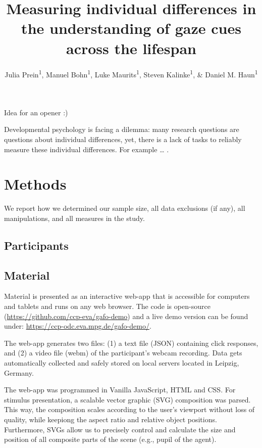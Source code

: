 \documentclass[
  english,
  man,floatsintext]{apa6}
\title{Measuring individual differences in the understanding of gaze cues across the lifespan}
\author{Julia Prein\textsuperscript{1}, Manuel Bohn\textsuperscript{1}, Luke Maurits\textsuperscript{1}, Steven Kalinke\textsuperscript{1}, \& Daniel M. Haun\textsuperscript{1}}
\date{}
\affiliation{\vspace{0.5cm}\textsuperscript{1} Department of Comparative Cultural Psychology, Max Planck Institute for Evolutionary Anthropology}
\begin{document}
\maketitle

Idea for an opener :)

Developmental psychology is facing a dilemma: many research questions are questions about individual differences, yet, there is a lack of tasks to reliably measure these individual differences. For example \ldots{} .

\hypertarget{methods}{%
\section{Methods}\label{methods}}

We report how we determined our sample size, all data exclusions (if any), all manipulations, and all measures in the study.

\hypertarget{participants}{%
\subsection{Participants}\label{participants}}

\hypertarget{material}{%
\subsection{Material}\label{material}}

Material is presented as an interactive web-app that is accessible for computers and tablets and runs on any web browser.
The code is open-source (\url{https://github.com/ccp-eva/gafo-demo})
and a live demo version can be found under: \url{https://ccp-odc.eva.mpg.de/gafo-demo/}.

The web-app generates two files:
(1) a text file (JSON) containing click responses,
and (2) a video file (webm) of the participant's webcam recording.
Data gets automatically collected and safely stored on local servers located in Leipzig, Germany.

The web-app was programmed in Vanilla JavaScript, HTML and CSS.
For stimulus presentation, a scalable vector graphic (SVG) composition was parsed.
This way, the composition scales according to the user's viewport without loss of quality,
while keepiong the aspect ratio and relative object positions.
Furthermore, SVGs allow us to precisely control and calculate the size and position of all
composite parts of the scene (e.g., pupil of the agent).
\end{document}
